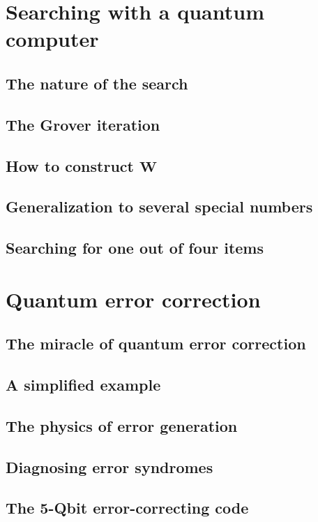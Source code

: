 \documentclass{book}
\theoremstyle{definition}
\begin{document}
\newpage

\section{Searching with a quantum computer}

\subsection{The nature of the search}
\subsection{The Grover iteration}
\subsection{How to construct $\mathbf{W}$}
\subsection{Generalization to several special numbers}
\subsection{Searching for one out of four items}


\newpage

\section{Quantum error correction}

\subsection{The miracle of quantum error correction}
\subsection{A simplified example}
\subsection{The physics of error generation}
\subsection{Diagnosing error syndromes}
\subsection{The 5-Qbit error-correcting code}
\end{document}

